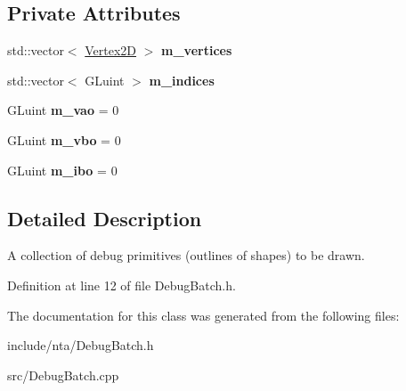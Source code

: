 \subsection*{Private Attributes}
\begin{DoxyCompactItemize}
\item 
\mbox{\label{classnta_1_1DebugBatch_a7c699660499350f5717a13dc2266cd9c}} 
std\+::vector$<$ \hyperlink{structnta_1_1Vertex2D}{Vertex2D} $>$ {\bfseries m\+\_\+vertices}
\item 
\mbox{\label{classnta_1_1DebugBatch_a1c0359676583c9c60d29b74b909939ee}} 
std\+::vector$<$ G\+Luint $>$ {\bfseries m\+\_\+indices}
\item 
\mbox{\label{classnta_1_1DebugBatch_a13089a13e5a589c9185c566e2957d0b5}} 
G\+Luint {\bfseries m\+\_\+vao} = 0
\item 
\mbox{\label{classnta_1_1DebugBatch_a8d3d799f71618a40d9403eda7f62a7de}} 
G\+Luint {\bfseries m\+\_\+vbo} = 0
\item 
\mbox{\label{classnta_1_1DebugBatch_ae85fcc91c2121dd5e438e73dfdf2c638}} 
G\+Luint {\bfseries m\+\_\+ibo} = 0
\end{DoxyCompactItemize}


\subsection{Detailed Description}
A collection of debug primitives (outlines of shapes) to be drawn. 

Definition at line 12 of file Debug\+Batch.\+h.



The documentation for this class was generated from the following files\+:\begin{DoxyCompactItemize}
\item 
include/nta/Debug\+Batch.\+h\item 
src/Debug\+Batch.\+cpp\end{DoxyCompactItemize}
